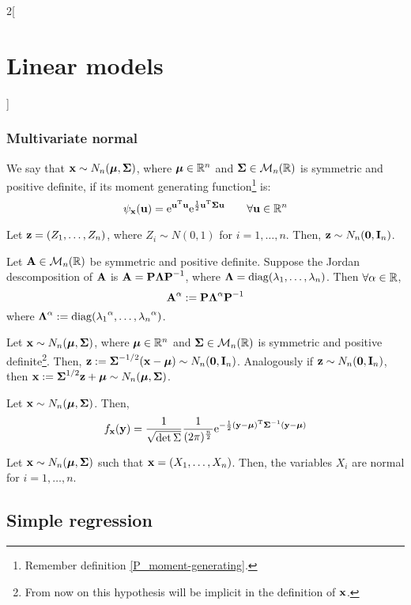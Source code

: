 \documentclass[../../../main_math.tex]{subfiles}
\begin{document}
\begin{multicols}{2}[\section{Linear models}]
  \subsubsection{Multivariate normal}
  \begin{definition}
    We say that $\vf{x}\sim N_n(\vf\mu,\vf\Sigma)$, where $\vf\mu\in\RR^n$ and $\vf\Sigma\in\mathcal{M}_n(\RR)$ is symmetric and positive definite, if its moment generating function\footnote{Remember definition \cref{P_moment-generating}.} is: $$\psi_{\vf{x}}(\vf{u})=\exp{\transpose{\vf{u}}\vf{u}}\exp{\frac{1}{2}\transpose{\vf{u}}\vf\Sigma\vf{u}}\qquad\forall\vf{u}\in\RR^n$$
  \end{definition}
  \begin{proposition}
    Let $\vf{z}=(Z_1,\ldots,Z_n)$, where $Z_i\sim N(0,1)$ for $i=1,\ldots,n$. Then, $\vf{z}\sim N_n(\vf{0},\vf{I}_n)$.
  \end{proposition}
  \begin{definition}
    Let $\vf{A}\in\mathcal{M}_n(\RR)$ be symmetric and positive definite. Suppose the Jordan descomposition of $\vf{A}$ is $\vf{A}=\vf{P}\vf{\Lambda}\vf{P}^{-1}$, where $\vf{\Lambda}=\diag(\lambda_1,\ldots,\lambda_n)$. Then $\forall \alpha\in\RR$, $$\vf{A}^\alpha:=\vf{P}\vf{\Lambda}^\alpha\vf{P}^{-1}$$ where $\vf{\Lambda}^\alpha:=\diag({\lambda_1}^\alpha,\ldots,{\lambda_n}^\alpha)$.
  \end{definition}
  \begin{proposition}
    Let $\vf{x}\sim N_n(\vf\mu,\vf\Sigma)$, where $\vf\mu\in\RR^n$ and $\vf\Sigma\in\mathcal{M}_n(\RR)$ is symmetric and positive definite\footnote{From now on this hypothesis will be implicit in the definition of $\vf{x}$.}. Then, $\vf{z}:={\vf\Sigma}^{-1/2}(\vf{x}-\vf{\mu})\sim N_n(\vf{0},\vf{I}_n)$.
    Analogously if $\vf{z}\sim N_n(\vf{0},\vf{I}_n)$, then $\vf{x}:={\vf\Sigma}^{1/2}\vf{z}+\vf\mu\sim N_n(\vf\mu,\vf\Sigma)$.
  \end{proposition}
  \begin{proposition}
    Let $\vf{x}\sim N_n(\vf\mu,\vf\Sigma)$. Then, $$f_{\vf{x}}(\vf{y})=\frac{1}{\sqrt{\det\Sigma}}\frac{1}{(2\pi)^{\frac{n}{2}}}\exp{-\frac{1}{2}\transpose{(\vf{y}-\vf\mu)}{\vf\Sigma}^{-1}(\vf{y}-\vf\mu)}$$
  \end{proposition}
  \begin{proposition}
    Let $\vf{x}\sim N_n(\vf\mu,\vf\Sigma)$ such that $\vf{x}=(X_1,\ldots,X_n)$. Then, the variables $X_i$ are normal for $i=1,\ldots,n$.
  \end{proposition}
  \subsection{Simple regression}

\end{multicols}
\end{document}
